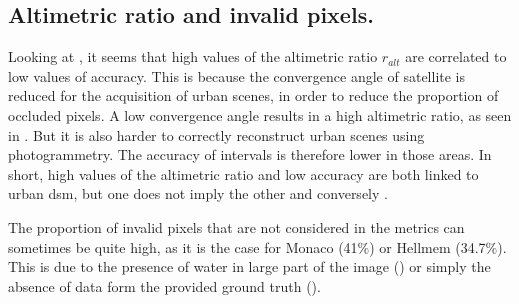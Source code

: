 \subsection{Altimetric ratio and invalid pixels.}
Looking at , it seems that high values of the altimetric ratio $r_{alt}$ are correlated to low values of accuracy. This is because the convergence angle of satellite is reduced for the acquisition of urban scenes, in order to reduce the proportion of occluded pixels. A low convergence angle results in a high altimetric ratio, as seen in . But it is also harder to correctly reconstruct urban scenes using photogrammetry. The accuracy of intervals is therefore lower in those areas. In short, high values of the altimetric ratio and low accuracy are both linked to urban \acrshort{dsm}, but one does not imply the other and conversely .

The proportion of invalid pixels that are not considered in the metrics can sometimes be quite high, as it is the case for Monaco (41$\%$) or Hellmem (34.7$\%$). This is due to the presence of water in large part of the image () or simply the absence of data form the provided ground truth ().

\marquepage


